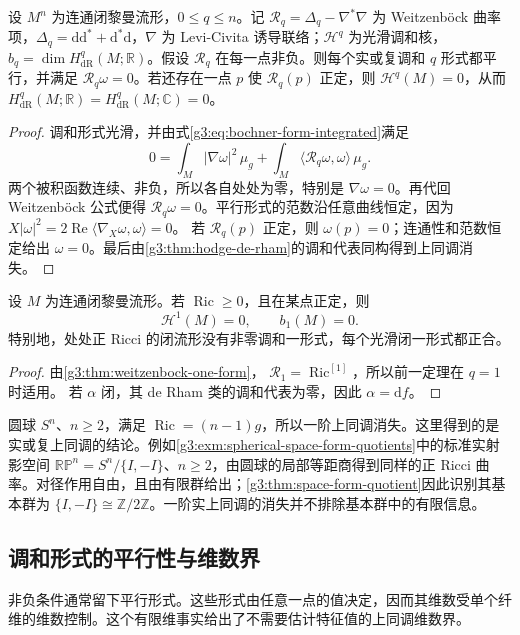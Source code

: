 \begin{theorem}\label{g3:thm:bochner-vanishing}
	设 \(M^n\) 为连通闭黎曼流形，\(0\le q\le n\)。记 \(\mathcal R_q=\Delta_q-\nabla^*\nabla\) 为 Weitzenböck 曲率项，\(\Delta_q=\mathrm d\mathrm d^*+\mathrm d^*\mathrm d\)，\(\nabla\) 为 Levi-Civita 诱导联络；\(\mathcal H^q\) 为光滑调和核，\(b_q=\dim H_{\mathrm{dR}}^q(M;\mathbb R)\)。假设
	\(\mathcal R_q\) 在每一点非负。则每个实或复调和 \(q\) 形式都平行，并满足
	\(\mathcal R_q\omega=0\)。若还存在一点 \(p\) 使
	\(\mathcal R_q(p)\) 正定，则
	\(\mathcal H^q(M)=0\)，从而
	\(H_{\mathrm{dR}}^q(M;\mathbb R)=H_{\mathrm{dR}}^q(M;\mathbb C)=0\)。
\end{theorem}
\begin{proof}
	调和形式光滑，并由式\eqref{g3:eq:bochner-form-integrated}满足
	\[
		0=\int_M|\nabla\omega|^2\,\mu_g
		  +\int_M\langle\mathcal R_q\omega,\omega\rangle\,\mu_g.
	\]
	两个被积函数连续、非负，所以各自处处为零，特别是
	\(\nabla\omega=0\)。再代回 Weitzenböck 公式便得
	\(\mathcal R_q\omega=0\)。平行形式的范数沿任意曲线恒定，因为
	\(X|\omega|^2=2\operatorname{Re}\langle\nabla_X\omega,\omega\rangle=0\)。
	若 \(\mathcal R_q(p)\) 正定，则 \(\omega(p)=0\)；连通性和范数恒定给出 \(\omega=0\)。最后由\cref{g3:thm:hodge-de-rham}的调和代表同构得到上同调消失。
\end{proof}

\begin{corollary}\label{g3:cor:positive-ricci-first-cohomology}
	设 \(M\) 为连通闭黎曼流形。若 \(\operatorname{Ric}\ge0\)，且在某点正定，则
	\[
		\mathcal H^1(M)=0,\qquad b_1(M)=0.
	\]
	特别地，处处正 Ricci 的闭流形没有非零调和一形式，每个光滑闭一形式都正合。
\end{corollary}
\begin{proof}
	由\cref{g3:thm:weitzenbock-one-form}，
	\(\mathcal R_1=\operatorname{Ric}^{[1]}\)，所以前一定理在 \(q=1\) 时适用。
	若 \(\alpha\) 闭，其 de Rham 类的调和代表为零，因此 \(\alpha=\mathrm df\)。
\end{proof}

圆球 \(S^n\)、\(n\ge2\)，满足 \(\operatorname{Ric}=(n-1)g\)，所以一阶上同调消失。这里得到的是实或复上同调的结论。例如\cref{g3:exm:spherical-space-form-quotients}中的标准实射影空间
\(\mathbb{RP}^n=S^n/\{I,-I\}\)、\(n\ge2\)，由圆球的局部等距商得到同样的正 Ricci 曲率。对径作用自由，且由有限群给出；\cref{g3:thm:space-form-quotient}因此识别其基本群为
\(\{I,-I\}\cong\mathbb Z/2\mathbb Z\)。一阶实上同调的消失并不排除基本群中的有限信息。

\subsection{调和形式的平行性与维数界}
\label{g3:subsec:1503:04}
非负条件通常留下平行形式。这些形式由任意一点的值决定，因而其维数受单个纤维的维数控制。这个有限维事实给出了不需要估计特征值的上同调维数界。

